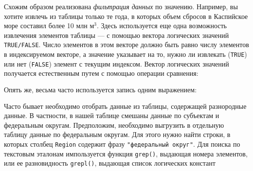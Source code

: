 \documentclass[]{book}
\newenvironment{Shaded}{\begin{snugshade}}{\end{snugshade}}
\newcommand{\DecValTok}[1]{\textcolor[rgb]{0.00,0.00,0.81}{#1}}
\newcommand{\StringTok}[1]{\textcolor[rgb]{0.31,0.60,0.02}{#1}}
\newcommand{\CommentTok}[1]{\textcolor[rgb]{0.56,0.35,0.01}{\textit{#1}}}
\newcommand{\OperatorTok}[1]{\textcolor[rgb]{0.81,0.36,0.00}{\textbf{#1}}}
\newcommand{\NormalTok}[1]{#1}
\begin{document}
Схожим образом реализована \emph{фильтрация данных} по значению.
Например, вы хотите извлечь из таблицы только те года, в которых объем
сбросов в Каспийское море составил более 10 млн м\(^3\). Здесь
используется еще одна возможность извлечения элементов таблицы --- с
помощью вектора логических значений \texttt{TRUE/FALSE}. Число элементов
в этом векторе должно быть равно числу элементов в индексируемом
векторе, а значение указывает на то, нужно ли извлекать (\texttt{TRUE})
или нет (\texttt{FALSE}) элемент с текущим индексом. Вектор логических
значений получается естественным путем с помощью операции сравнения:

\begin{Shaded}
\end{Shaded}

Опять же, весьма часто используется запись одним выражением:

\begin{Shaded}
\end{Shaded}

Часто бывает необходимо отобрать данные из таблицы, содержащей
разнородные данные. В частности, в нашей таблице смешаны данные по
субъектам и федеральным округам. Предположим, необходимо выгрузить в
отдельную таблицу данные по федеральным округам. Для этого нужно найти
строки, в которых столбец \texttt{Region} содержит фразу
\texttt{"федеральный\ округ"}. Для поиска по текстовым эталонам
импользуется функция \texttt{grep()}, выдающая номера элементов, или ее
разновидность \texttt{grepl()}, выдающая список логических констант
\end{document}
